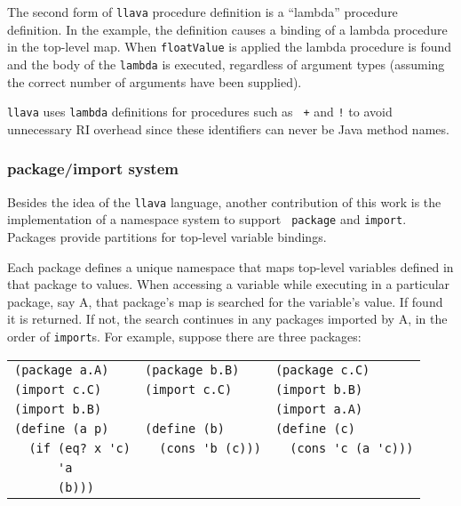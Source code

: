 \documentclass{acm-final/sig-alternate-modified}
\begin{document}
The second form of {\tt llava} procedure definition is a ``lambda''
procedure definition.  In the example, the definition causes a binding
of a lambda procedure in the top-level map.  When {\tt floatValue} is
applied the lambda procedure is found and the body of the {\tt lambda}
is executed, regardless of argument types (assuming the correct number
of arguments have been supplied).

{\tt llava} uses {\tt lambda} definitions for procedures such as {\tt
+} and {\tt !} to avoid unnecessary RI overhead since these
identifiers can never be Java method names.

\subsubsection{package/import system}

Besides the idea of the {\tt llava} language, another contribution of
this work is the implementation of a namespace system to support {\tt
package} and {\tt import}.  Packages provide partitions for top-level
variable bindings.

Each package defines a unique namespace that maps top-level variables
defined in that package to values.  When accessing a variable while
executing in a particular package, say A, that package's map is
searched for the variable's value.  If found it is returned.  If not,
the search continues in any packages imported by A, in the order of
{\tt import}s.  For example, suppose there are three packages:


\scriptsize
\begin{tabular}{l|l|l}
\verb+(package a.A)+    & \verb+(package b.B)+    & \verb+(package c.C)+ \\
\verb+(import c.C)+     & \verb+(import c.C)+     & \verb+(import b.B)+ \\
\verb+(import b.B)+     &                         & \verb+(import a.A)+ \\
\verb+(define (a p)+    & \verb+(define (b)+      & \verb+(define (c)+ \\
\verb+  (if (eq? x 'c)+ & \verb+  (cons 'b (c)))+ & \verb+  (cons 'c (a 'c)))+ \\
\verb+      'a+         &                         & \\
\verb+      (b)))+      &                         & \\
\end{tabular}
\normalsize
\end{document}
